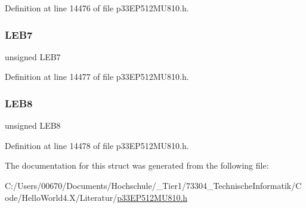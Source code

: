 Definition at line 14476 of file p33\+E\+P512\+M\+U810.\+h.

\mbox{\label{structtag_l_e_b_d_l_y2_b_i_t_s_aa76d586b04119d8459718019ddd964ef}} 
\subsubsection{\texorpdfstring{L\+E\+B7}{LEB7}}
{\footnotesize\ttfamily unsigned L\+E\+B7}



Definition at line 14477 of file p33\+E\+P512\+M\+U810.\+h.

\mbox{\label{structtag_l_e_b_d_l_y2_b_i_t_s_a9b22b47001301c6ae00c3eea0f385091}} 
\subsubsection{\texorpdfstring{L\+E\+B8}{LEB8}}
{\footnotesize\ttfamily unsigned L\+E\+B8}



Definition at line 14478 of file p33\+E\+P512\+M\+U810.\+h.



The documentation for this struct was generated from the following file\+:\begin{DoxyCompactItemize}
\item 
C\+:/\+Users/00670/\+Documents/\+Hochschule/\+\_\+\+Tier1/73304\+\_\+\+Technische\+Informatik/\+Code/\+Hello\+World4.\+X/\+Literatur/\hyperlink{p33_e_p512_m_u810_8h}{p33\+E\+P512\+M\+U810.\+h}\end{DoxyCompactItemize}
